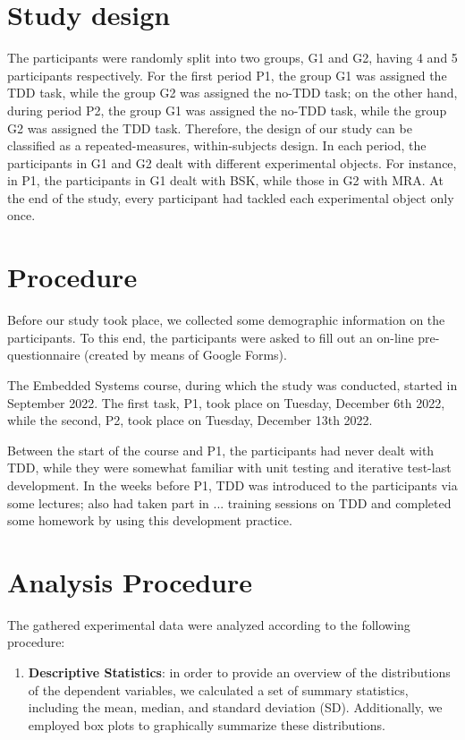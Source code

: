 \section{Study design}
The participants were randomly split into two groups, G1 and G2, having 4 and 5 participants respectively. For the first period P1, the group G1 was assigned the TDD task, while the group G2 was assigned the no-TDD task; on the other hand, during period P2, the group G1 was assigned the no-TDD task, while the group G2 was assigned the TDD task.
Therefore, the design of our study can be classified as a repeated-measures, within-subjects design. In each period, the participants in G1 and G2 dealt with different experimental objects. For instance, in P1, the participants in G1 dealt with BSK, while those in G2 with MRA. At the end of the study, every participant had tackled each experimental object only once.

\section{Procedure}
Before our study took place, we collected some demographic information on the participants. To this end, the participants were asked to fill out an on-line pre-questionnaire (created by means of Google Forms).

The Embedded Systems course, during which the study was conducted, started in September 2022. The first task, P1, took place on Tuesday, December 6th 2022, while the second, P2, took place on Tuesday, December 13th 2022.

Between the start of the course and P1, the participants had never dealt with TDD, while they were somewhat familiar with unit testing and iterative test-last development. In the weeks before P1, TDD was introduced to the participants via some lectures; also had taken part in ... training sessions on TDD and completed some homework by using this development practice.



\section {Analysis Procedure}
The gathered experimental data were analyzed according to the following procedure:
\begin{enumerate}
    \item \textbf{Descriptive Statistics}: in order to provide an overview of the distributions of the dependent variables, we calculated a set of summary statistics, including the mean, median, and standard deviation (SD). Additionally, we employed box plots to graphically summarize these distributions.
\end{enumerate}


